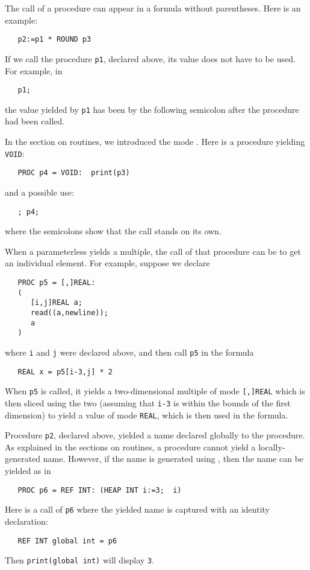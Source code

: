 The call of a procedure can appear in a formula without parentheses.
Here is an example:
\begin{verbatim}
   p2:=p1 * ROUND p3
\end{verbatim}
\noindent
If we call the procedure \verb|p1|, declared above, its value does not
have to be used.  For example, in
\begin{verbatim}
   p1;
\end{verbatim}
\noindent
the value yielded by \verb|p1| has been 
by the following semicolon after the procedure had been called.

In the section on routines, we introduced the mode . Here
is a procedure yielding \verb|VOID|:
\begin{verbatim}
   PROC p4 = VOID:  print(p3)
\end{verbatim}
\noindent
and a possible use:
\begin{verbatim}
   ; p4;
\end{verbatim}
\noindent
where the semicolons show that the call stands on its own.

When a parameterless  yields
a multiple, the call of that procedure can be 
to get an individual element.  For example, suppose we declare
\begin{verbatim}
   PROC p5 = [,]REAL:
   (
      [i,j]REAL a;
      read((a,newline));
      a
   )
\end{verbatim}
\noindent
where \verb|i| and \verb|j| were declared above, and then call
\verb|p5| in the formula
\begin{verbatim}
   REAL x = p5[i-3,j] * 2
\end{verbatim}
\noindent
When \verb|p5| is called, it yields a two-dimensional multiple of mode
\verb|[,]REAL| which is then sliced using the two
 (assuming that \verb|i-3| is within the
bounds of the first dimension) to yield a value of mode \verb|REAL|,
which is then used in the formula.

Procedure \verb|p2|, declared above, yielded a name declared globally
to the procedure. As explained in the sections on routines, a
procedure cannot yield a locally-generated name. However, if the name
is generated using , then the name can be yielded as in
\begin{verbatim}
   PROC p6 = REF INT: (HEAP INT i:=3;  i)
\end{verbatim}
\noindent
Here is a call of \verb|p6| where the yielded name is captured with an
identity declaration:
\begin{verbatim}
   REF INT global int = p6
\end{verbatim}
\noindent
Then \verb|print(global int)| will display \verb|3|.

